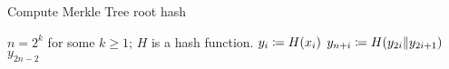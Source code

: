 \begin{algorithm}[p]
\caption{Compute Merkle Tree root hash}
\label{alg:merkle_tree}
\begin{algorithmic}[1]
\Require $n = 2^{k}$ for some $k\ge1$; $H$ is a \gls{hash function}.
        \State $y_{i} \coloneqq{} H(x_{i})$
    \EndFor
        \State $y_{n+i} \coloneqq{} H(y_{2i}\|y_{2i+1})$
    \EndFor
    \State \Return $y_{2n-2}$
\EndProcedure
\end{algorithmic}
\end{algorithm}
